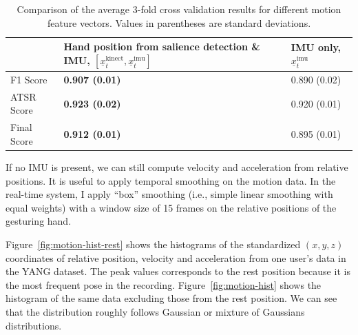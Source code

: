 \begin{table}[tbh]
\begin{center}
\begin{tabular}{|l|p{6cm}|p{4cm}|}
\hline
 & Hand position from salience detection \& IMU,
 $[\underline{x}^\text{kinect}_t, \underline{x}^\text{imu}_t]$ & IMU only, $\underline{x}^\text{imu}_t$ \\
\hline
F1 Score & \textbf{0.907 (0.01)} & 0.890 (0.02) \\
\hline
ATSR Score & \textbf{0.923 (0.02)}  & 0.920 (0.01) \\
\hline
Final Score & \textbf{0.912 (0.01)}  & 0.895 (0.01) \\
\hline
\end{tabular}
\caption{Comparison of the average 3-fold cross validation results for different
motion feature vectors. Values in parentheses are standard deviations.}
\label{tab:comp-motion-feature}
\end{center}
\end{table}

If no IMU is present, we can still compute velocity and acceleration from
relative positions.
It is useful to apply temporal smoothing on the motion data. In the
real-time system, I apply ``box'' smoothing (i.e., simple linear smoothing
with equal weights) with a window size of 15 frames on the relative positions of
the gesturing hand.

Figure~\ref{fig:motion-hist-rest} shows the histograms of the standardized $(x,
y, z)$ coordinates of relative position, velocity and acceleration from one user's
data in the YANG dataset. The peak values corresponds to the rest position
because it is the most frequent pose in the recording.
Figure~\ref{fig:motion-hist} shows the histogram of the same data excluding
those from the rest position. We can see that the distribution roughly follows
Gaussian or mixture of Gaussians distributions.

